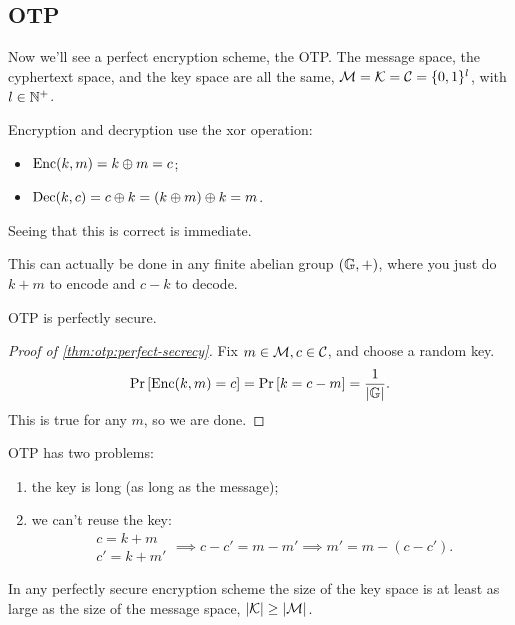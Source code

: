 \subsection{\acl{OTP}}

Now we'll see a perfect encryption scheme, the \ac{OTP}.
The message space, the cyphertext space, and the key space are all the same, \ie $\mathcal{M} = \mathcal{K} = \mathcal{C} = \{0,1\}^{l}$, with $l \in \mathbb{N}^{+}$.

Encryption and decryption use the xor operation:
\begin{itemize}
	\item $\mathrm{Enc}(k,m) = k \oplus m = c$;
	\item $\mathrm{Dec}(k,c) = c \oplus k = (k \oplus m) \oplus k = m$.
\end{itemize}
Seeing that this is correct is immediate.

This can actually be done in any finite abelian group $(\mathbb{G}, +)$, where you just do $k + m$ to encode and $c - k$ to decode.

\begin{theorem} \label{thm:otp:perfect-secrecy}
	\ac{OTP} is perfectly secure.
\end{theorem}

\begin{proof}[Proof of \cref{thm:otp:perfect-secrecy}]
	Fix $m \in \mathcal{M}, c \in \mathcal{C}$, and choose a random key.
	\begin{equation*}
		\mathop{\mathrm{Pr}}\limits_{} \left[ {\mathrm{Enc}(k,m) = c} \right] = \mathop{\mathrm{Pr}}\limits_{} \left[ {k = c - m} \right] = \frac{1}{\left|{\mathbb{G}}\right|}.
	\end{equation*}
	This is true for any $m$, so we are done.
\end{proof}

\ac{OTP} has two problems:
\begin{enumerate}
	\item the key is long (as long as the message);
	\item we can't reuse the key:
	\begin{equation*}
		\begin{array}{c}
			c = k + m \\
			c' = k + m'
		\end{array}
		\implies
		c - c' = m - m'
		\implies
		m' = m - (c - c').
	\end{equation*}
\end{enumerate}

\begin{theorem}[Shannon, 1949] \label{thm:shannon:1949}
	In any perfectly secure encryption scheme the size of the key space is at least as large as the size of the message space, \ie $\left|{\mathcal{K}}\right| \ge \left|{\mathcal{M}}\right|$.
\end{theorem}

